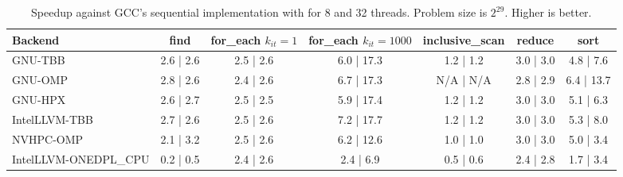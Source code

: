 \documentclass[sigconf]{acmart}
\begin{document}
\begin{table}[t]
      \centering
      \centering
      \caption{Speedup against GCC's sequential implementation with for 8 and 32 threads. Problem size is $2^{29}$. Higher is better.}\label{tab:summary_speedup}
      \begin{tabular}{l c c c c c c}
            \hline
            \textbf{Backend}      & \textbf{find} & \makecell{\textbf{for\_each}                                                   \\$k_{it}=1$} & \makecell{\textbf{for\_each}\\$k_{it}=1000$} & \textbf{inclusive\_scan} & \textbf{reduce} & \textbf{sort} \\
            \hline
            GNU-TBB               & 2.6 | 2.6     & 2.5 | 2.6                    & 6.0 | 17.3 & 1.2 | 1.2 & 3.0 | 3.0 & 4.8 | 7.6  \\
            GNU-OMP               & 2.8 | 2.6     & 2.4 | 2.6                    & 6.7 | 17.3 & N/A | N/A & 2.8 | 2.9 & 6.4 | 13.7 \\
            GNU-HPX               & 2.6 | 2.7     & 2.5 | 2.5                    & 5.9 | 17.4 & 1.2 | 1.2 & 3.0 | 3.0 & 5.1 | 6.3  \\
            IntelLLVM-TBB         & 2.7 | 2.6     & 2.5 | 2.6                    & 7.2 | 17.7 & 1.2 | 1.2 & 3.0 | 3.0 & 5.3 | 8.0  \\
            NVHPC-OMP             & 2.1 | 3.2     & 2.5 | 2.6                    & 6.2 | 12.6 & 1.0 | 1.0 & 3.0 | 3.0 & 5.0 | 3.4  \\
            IntelLLVM-ONEDPL\_CPU & 0.2 | 0.5     & 2.4 | 2.6                    & 2.4 | 6.9  & 0.5 | 0.6 & 2.4 | 2.8 & 1.7 | 3.4  \\
            \hline
      \end{tabular}
\end{table}
\end{document}

